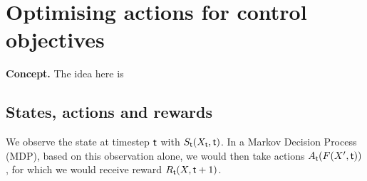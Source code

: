 \chapter{\sffamily Optimising actions for control objectives}

{\bfseries\sffamily Concept.} The idea here is 

\section{\sffamily States, actions and rewards}

We observe the state at timestep ${\sf t}$ with $S_{{\sf t}}(X_{{\sf t}}, {\sf t})$. In a Markov Decision Process (MDP), based on this observation alone, we would then take actions $A_{{\sf t}}(F(X', {\sf t}))$, for which we would receive reward $R_{{\sf t}}(X, {\sf t}+1)$.
